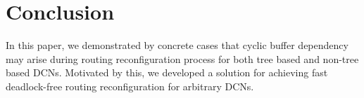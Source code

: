 \section{Conclusion}\label{sec:conclusion}

In this paper, we demonstrated by concrete cases that cyclic buffer dependency may arise during routing reconfiguration process for both tree based and non-tree based DCNs.  Motivated by this, we developed a solution for achieving fast deadlock-free routing reconfiguration for arbitrary DCNs. 


